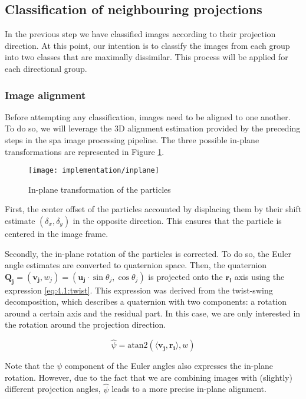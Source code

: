 \documentclass[../main.tex]{subfiles}
\begin{document}
\subsection{Classification of neighbouring projections}
In the previous step we have classified images according to their projection direction.  At this point, our intention is to classify the images from each group into two classes that are maximally dissimilar. This process will be applied for each directional group.

\subsubsection{Image alignment}
Before attempting any classification, images need to be aligned to one another. To do so, we will leverage the 3D alignment estimation provided by the preceding steps in the \gls{spa} image processing pipeline. The three possible in-plane transformations are represented in Figure \ref{fig:4.1:inplane}.

\begin{figure}[hbp]
    \centering
    \texttt{[image: implementation/inplane]}
    \caption{In-plane transformation of the particles}
    \label{fig:4.1:inplane}
\end{figure}

First, the center offset of the particles accounted by displacing them by their shift estimate $(\delta_x, \delta_y)$ in the opposite direction. This ensures that the particle is centered in the image frame. 

Secondly, the in-plane rotation of the particles is corrected. To do so, the Euler angle estimates are converted to quaternion space. Then, the quaternion $\bm{Q_j} = (\bm{v_j}, w_j) = (\bm{u_j} \cdot \sin\theta_j, \cos\theta_j)$ is projected onto the $\bm{r_i}$ axis using the expression \eqref{eq:4.1:twist}. This expression was derived from the twist-swing\cite{chou2018} decomposition, which describes a quaternion with two components: a rotation around a certain axis and the residual part. In this case, we are only interested in the rotation around the projection direction.

\begin{equation}\label{eq:4.1:twist}
    \hat{\psi} = \text{atan2}(\langle \bm{v_j}, \bm{r_i} \rangle, w)
\end{equation}

Note that the $\psi$ component of the Euler angles also expresses the in-plane rotation. However, due to the fact that we are combining images with (slightly) different projection angles, $\hat{\psi}$ leads to a more precise in-plane alignment.
\end{document}
